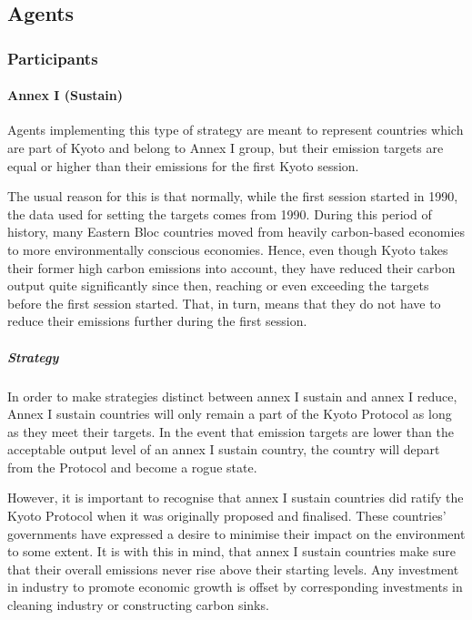 \documentclass[]{article} %
\begin{document}
\subsection{Agents}

\subsubsection{Participants}

\paragraph{Annex I (Sustain)}

Agents implementing this type of strategy are meant to represent countries which are part of Kyoto and belong to Annex I group, but their emission targets are equal or higher than their emissions for the first Kyoto session.

The usual reason for this is that normally, while the first session started in 1990, the data used for setting the targets comes from 1990. During this period of history, many Eastern Bloc countries moved from heavily carbon-based economies to more environmentally conscious economies. Hence, even though Kyoto takes their former high carbon emissions into account, they have reduced their carbon output quite significantly since then, reaching or even exceeding the targets before the first session started. That, in turn, means that they do not have to reduce their emissions further during the first session.

\subparagraph{Strategy}

In order to make strategies distinct between annex I sustain and annex I reduce, Annex I sustain countries will only remain a part of the Kyoto Protocol as long as they meet their targets. In the event that emission targets are lower than the acceptable output level of an annex I sustain country, the country will depart from the Protocol and become a rogue state. 

However, it is important to recognise that annex I sustain countries did ratify the Kyoto Protocol when it was originally proposed and finalised.   These countries’ governments have expressed a desire to minimise their impact on the environment to some extent.   It is with this in mind, that annex I sustain countries make sure that their overall emissions never rise above their starting levels.   Any investment in industry to promote economic growth is offset by corresponding investments in cleaning industry or constructing carbon sinks.
\end{document}

